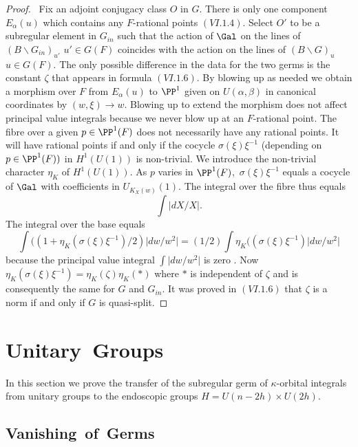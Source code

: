 \documentclass{memo-l}
\theoremstyle{definition}
\theoremstyle{remark}
\numberwithin{section}{chapter}
\numberwithin{equation}{chapter}
\begin{document}
\begin{proof} \ Fix an adjoint conjugacy class $O$ in $G$.  There is
only one component $E_{{\alpha}}(u)$ which contains any $F$-rational points
$(VI.1.4)$.  Select $O'$ to be a subregular element in $G_{in}$ such that
the action of $\Gal$ on the lines of $(B\backslash G_{in})_{u'}$
 $u'  \in  G(F)$ coincides with the action on the lines of $(B\backslash
G)_{u}$ $u  \in  G(F)$.  The only possible difference in the data for the two
germs is the constant ${\zeta}$ that appears in formula $(VI.1.6)$.  By
blowing up as needed we obtain a morphism over $F$ from $E_{{\alpha}}(u)$
to ${\PP}^{1}$ given on $U({\alpha},{\beta})$ in canonical coordinates
by $(w,{\xi}) {\to} w$.  Blowing up to extend the morphism does not affect
principal value integrals because we never blow up at an $F$-rational
point.  The fibre over a given $p  \in  {\PP}^{1}(F)$ does not
necessarily have any rational points.  It will have rational points if and
only if the cocycle ${\sigma}({\xi}){\xi}^{-1}$ (depending on $p  \in
{\PP}^{1}(F))$ in $H^{1}(U(1))$ is non-trivial.  We introduce the
non-trivial character ${\eta}_{K}$ of $H^{1}(U(1))$.  As $p$ varies in
${\PP}^{1}(F)$,\  ${\sigma}({\xi}){\xi}^{-1}$ equals a cocycle of $\Gal$
with coefficients in $U_{K_X(w)}(1)$.  The integral over the fibre
thus equals
$$
\int\vert dX/X\vert.
$$
The integral over the base equals
$$
\int((1+{\eta}_{K}({\sigma}({\xi}){\xi}^{-1})/2)\vert dw/w^{2}\vert  =
(1/2) \int {\eta}_{K}(({\sigma}({\xi}){\xi}^{-1})\vert dw/w^2\vert
$$
because the principal value integral $\int\vert dw/w^{2}\vert$ is zero
\cite{MR748510}.  Now ${\eta}_{K}({\sigma}({\xi}){\xi}^{-1})  =
{\eta}_{K}({\zeta}){\eta}_{K}(*)$ where $*$ is independent of ${\zeta}$ and
is consequently the same for $G$ and $G_{in}$.  It was proved in $(VI.1.6)$
that ${\zeta}$ is a norm if and only if $G$ is quasi-split.
\end{proof}

\section{Unitary\ Groups}

   In this section we prove the transfer of the subregular germ of
${\kappa}$-orbital integrals from unitary groups to the endoscopic groups $H
 =  U(n-2h)\times U(2h)$.

\subsection{Vanishing\ of\ Germs}
\end{document}
